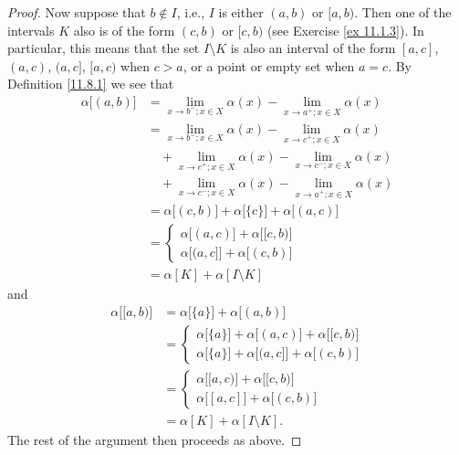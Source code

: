 \begin{proof}
    Now suppose that \(b \notin I\), i.e., \(I\) is either \((a, b)\) or \([a, b)\).
    Then one of the intervals \(K\) also is of the form \((c, b)\) or \([c, b)\) (see Exercise \ref{ex 11.1.3}).
            In particular, this means that the set \(I \setminus K\) is also an interval of the form \([a, c]\), \((a, c)\), \((a, c]\), \([a, c)\) when \(c > a\), or a point or empty set when \(a = c\).
    By Definition \ref{11.8.1} we see that
    \begin{align*}
        \alpha\big[(a, b)\big] & = \lim_{x \to b^- ; x \in X} \alpha(x) - \lim_{x \to a^+ ; x \in X} \alpha(x)       \\
                               & = \lim_{x \to b^- ; x \in X} \alpha(x) - \lim_{x \to c^+ ; x \in X} \alpha(x)       \\
                               & \quad + \lim_{x \to c^+ ; x \in X} \alpha(x) - \lim_{x \to c^- ; x \in X} \alpha(x) \\
                               & \quad + \lim_{x \to c^- ; x \in X} \alpha(x) - \lim_{x \to a^+ ; x \in X} \alpha(x) \\
                               & = \alpha\big[(c, b)\big] + \alpha\big[\{c\}\big] + \alpha\big[(a, c)\big]           \\
                               & = \begin{cases}
                                       \alpha\big[(a, c)\big] + \alpha\big[[c, b)\big] \\
                                           \alpha\big[(a, c]\big] + \alpha\big[(c, b)\big]
                                   \end{cases}        \\
                               & = \alpha[K] + \alpha[I \setminus K]
    \end{align*}
    and
    \begin{align*}
        \alpha\big[[a, b)\big] & = \alpha\big[\{a\}\big] + \alpha\big[(a, b)\big]                                                      \\
                               & = \begin{cases}
                                       \alpha\big[\{a\}\big] + \alpha\big[(a, c)\big] + \alpha\big[[c, b)\big] \\
                                           \alpha\big[\{a\}\big] + \alpha\big[(a, c]\big] + \alpha\big[(c, b)\big]
                                   \end{cases} \\
                               & = \begin{cases}
                                       \alpha\big[[a, c)\big] + \alpha\big[[c, b)\big] \\
                                       \alpha\big[[a, c]\big] + \alpha\big[(c, b)\big]
                                   \end{cases}                     \\
                               & = \alpha[K] + \alpha[I \setminus K].
    \end{align*}
    The rest of the argument then proceeds as above.
\end{proof}

